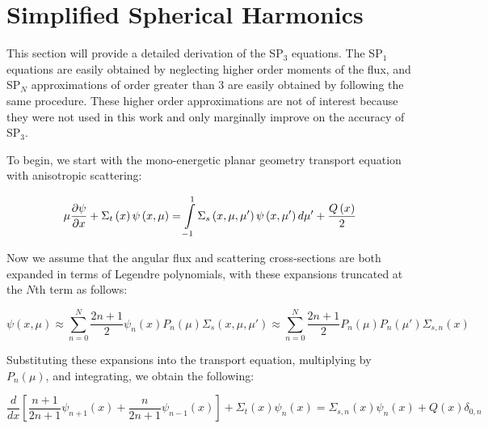 \section{Simplified Spherical Harmonics}\label{appsec:SPn}

This section will provide a detailed derivation of the SP$_3$ equations.  The SP$_1$ equations are easily obtained by neglecting higher order moments of the flux, and SP$_N$ approximations of order greater than 3 are easily obtained by following the same procedure.  These higher order approximations are not of interest because they were not used in this work and only marginally improve on the accuracy of SP$_3$.

To begin, we start with the mono-energetic planar geometry transport equation with anisotropic scattering:

\begin{equation}
\mu\frac{\partial \psi}{\partial x} + \Sigma_{t}\left(x\right) \psi\left(x,\mu\right) = \intop_{-1}^1 \Sigma_{s}\left(x,\mu,\mu'\right) \psi\left(x,\mu'\right) d\mu' + \frac{Q\left(x\right)}{2}
\end{equation}

Now we assume that the angular flux and scattering cross-sections are both expanded in terms of Legendre polynomials, with these expansions truncated at the $N$th term as follows:

\begin{subequations}
\begin{equation}
\psi\left(x,\mu\right) \approx \sum_{n=0}^N \frac{2n+1}{2} \psi_{n}\left(x\right) P_n\left(\mu\right)
\end{equation}
\begin{equation}
\Sigma_{s}\left(x,\mu,\mu'\right) \approx \sum_{n=0}^N \frac{2n+1}{2} P_n\left(\mu\right)P_n\left(\mu'\right)\Sigma_{s,n}\left(x\right)
\end{equation}
\end{subequations}

Substituting these expansions into the transport equation, multiplying by $P_n\left(\mu\right)$, and integrating, we obtain the following:

\begin{equation}\label{e:SPnGeneral}
\frac{d}{dx}\left[\frac{n+1}{2n+1}\psi_{n+1}\left(x\right) + \frac{n}{2n+1}\psi_{n-1}\left(x\right)\right] + \Sigma_{t}\left(x\right) \psi_{n}\left(x\right) = \Sigma_{s,n}\left(x\right) \psi_n\left(x\right) + Q\left(x\right)\delta_{0,n}
\end{equation}

